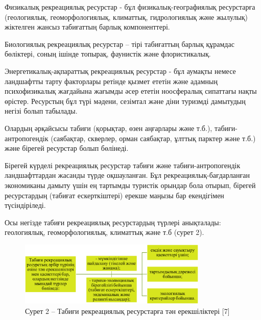 \begin{multicols}{2}
Физикалық рекреациялық ресурстар - бұл физикалық-географиялық
ресурстарға (геологиялық, геоморфологиялық, климаттық, гидрологиялық
және жылулық) жіктелген жансыз табиғаттың барлық компоненттері.

Биологиялық рекреациялық ресурстар -- тірі табиғаттың барлық құрамдас
бөліктері, соның ішінде топырақ, фаунистік және флористикалық.

Энергетикалық-ақпараттық рекреациялық ресурстар - бұл аумақты немесе
ландшафтты тарту факторлары ретінде қызмет ететін және адамның
психофизикалық жағдайына жағымды әсер ететін ноосфералық сипаттағы нақты
өрістер. Ресурстың бұл түрі мәдени, сезімтал және діни туризмді
дамытудың негізі болып табылады.

Олардың әрқайсысы табиғи (қорықтар, өзен аңғарлары және т.б.),
табиғи-антропогендік (саябақтар, скверлер, орман саябақтар, ұлттық
парктер және т.б.) және бірегей ресурстар болып бөлінеді.

Бірегей күрделі рекреациялық ресурстар табиғи және табиғи-антропогендік
ландшафттардан жасанды түрде оқшауланған. Бұл рекреациялық-бағдарланған
экономиканы дамыту үшін ең тартымды туристік орындар бола отырып,
бірегей ресурстардың (табиғат ескерткіштері) ерекше маңызы бар
екендігімен түсіндіріледі.

Осы негізде табиғи рекреациялық ресурстардың түрлері анықталады:
геологиялық, геоморфологиялық, климаттық және т.б (сурет 2).
\end{multicols}

\begin{figure}[H]
	\centering
	\includegraphics[width=0.8\textwidth]{assets/1112}
	\caption*{Сурет 2 -- Табиғи рекреациялық ресурстарға тән ерекшіліктері {[}7{]}}
\end{figure}

